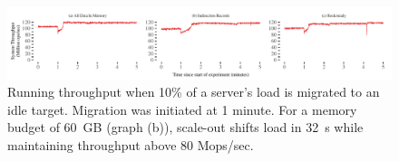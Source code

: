 \begin{figure}[t]
\centering
\includegraphics[width=1.0\textwidth]{graphs/comparison.pdf}
\caption{Running throughput when 10\% of a server's load is migrated
    to an idle target. Migration was initiated at 1 minute. For a
    memory budget of 60~GB (graph (b)),
    scale-out shifts load in 32~s while maintaining
    throughput above 80 Mops/sec.}
\label{fig:migration}
\end{figure}
